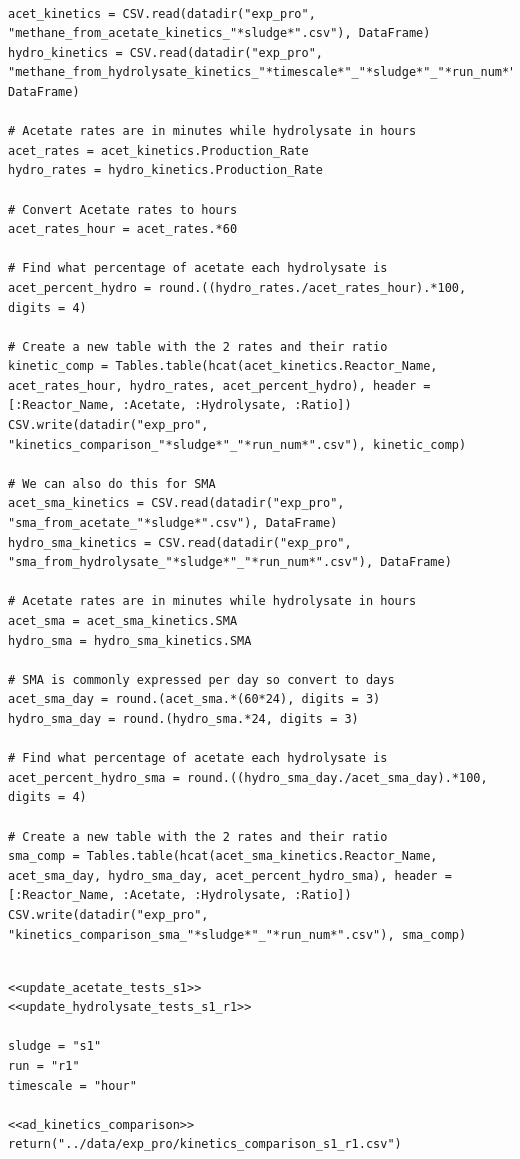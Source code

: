 \documentclass[11pt]{article}
\begin{document}
\begin{verbatim}

acet_kinetics = CSV.read(datadir("exp_pro", "methane_from_acetate_kinetics_"*sludge*".csv"), DataFrame)
hydro_kinetics = CSV.read(datadir("exp_pro", "methane_from_hydrolysate_kinetics_"*timescale*"_"*sludge*"_"*run_num*".csv"), DataFrame)

# Acetate rates are in minutes while hydrolysate in hours
acet_rates = acet_kinetics.Production_Rate
hydro_rates = hydro_kinetics.Production_Rate

# Convert Acetate rates to hours
acet_rates_hour = acet_rates.*60

# Find what percentage of acetate each hydrolysate is
acet_percent_hydro = round.((hydro_rates./acet_rates_hour).*100, digits = 4)

# Create a new table with the 2 rates and their ratio
kinetic_comp = Tables.table(hcat(acet_kinetics.Reactor_Name, acet_rates_hour, hydro_rates, acet_percent_hydro), header = [:Reactor_Name, :Acetate, :Hydrolysate, :Ratio])
CSV.write(datadir("exp_pro", "kinetics_comparison_"*sludge*"_"*run_num*".csv"), kinetic_comp)

# We can also do this for SMA
acet_sma_kinetics = CSV.read(datadir("exp_pro", "sma_from_acetate_"*sludge*".csv"), DataFrame)
hydro_sma_kinetics = CSV.read(datadir("exp_pro", "sma_from_hydrolysate_"*sludge*"_"*run_num*".csv"), DataFrame)

# Acetate rates are in minutes while hydrolysate in hours
acet_sma = acet_sma_kinetics.SMA
hydro_sma = hydro_sma_kinetics.SMA

# SMA is commonly expressed per day so convert to days
acet_sma_day = round.(acet_sma.*(60*24), digits = 3)
hydro_sma_day = round.(hydro_sma.*24, digits = 3)

# Find what percentage of acetate each hydrolysate is
acet_percent_hydro_sma = round.((hydro_sma_day./acet_sma_day).*100, digits = 4)

# Create a new table with the 2 rates and their ratio
sma_comp = Tables.table(hcat(acet_sma_kinetics.Reactor_Name, acet_sma_day, hydro_sma_day, acet_percent_hydro_sma), header = [:Reactor_Name, :Acetate, :Hydrolysate, :Ratio])
CSV.write(datadir("exp_pro", "kinetics_comparison_sma_"*sludge*"_"*run_num*".csv"), sma_comp)

\end{verbatim}

\begin{verbatim}

<<update_acetate_tests_s1>>
<<update_hydrolysate_tests_s1_r1>>

sludge = "s1"
run = "r1"
timescale = "hour"

<<ad_kinetics_comparison>>
return("../data/exp_pro/kinetics_comparison_s1_r1.csv")
\end{verbatim}
\end{document}
